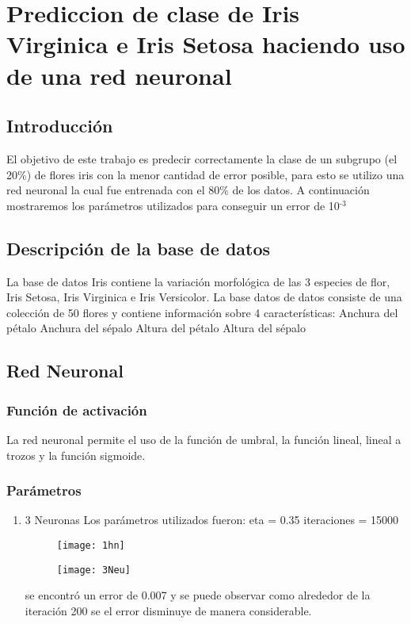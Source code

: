 \documentclass[11pt]{article}
\date{\today}
\title{}
\begin{document}

\section{Prediccion de clase de Iris Virginica e Iris Setosa haciendo uso de una red neuronal}
\label{sec:org62f021f}

\subsection{Introducción}
\label{sec:org9461112}
El objetivo de este trabajo es predecir correctamente la clase de un subgrupo (el 20\%) de flores iris con la menor cantidad de error posible, para esto se utilizo una red neuronal la cual fue entrenada con el 80\% de los datos. A continuación mostraremos los parámetros utilizados para conseguir un error de 10\(^{\text{-3}}\)

\subsection{Descripción de la base de datos}
\label{sec:orge27d66d}
La base de datos Iris contiene la variación morfológica de las 3 especies de flor, Iris Setosa, Iris Virginica e Iris Versicolor. La base datos de datos consiste de una colección de 50 flores y contiene información sobre 4 características:
Anchura del pétalo
Anchura del sépalo
Altura del pétalo
Altura del sépalo

\subsection{Red Neuronal}
\label{sec:orgc689a29}
\subsubsection{Función de activación}
\label{sec:orgb2a2ec9}
La red neuronal permite el uso de la función de umbral, la función lineal, lineal a trozos y la función sigmoide.
\subsubsection{Parámetros}
\label{sec:orga0bff03}
\begin{enumerate}
\item 3 Neuronas
\label{sec:org2c5c798}
Los parámetros utilizados fueron:
eta = 0.35
iteraciones = 15000
\begin{figure}[t]
    \texttt{[image: 1hn]}
    \centering
    \caption{}
    \label{1neurona}
\end{figure}

\begin{figure}[t]
    \texttt{[image: 3Neu]}
    \centering
    \caption{}
    \label{3neuronas}
\end{figure}


se encontró un error de 0.007 y se puede observar como alrededor de la iteraci\'on 200 se el error disminuye de manera considerable.
\end{enumerate}
\end{document}
